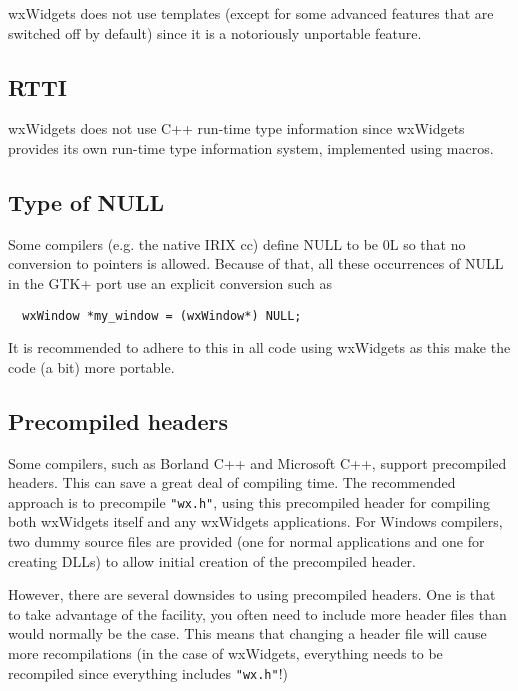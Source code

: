 wxWidgets does not use templates (except for some advanced features that
are switched off by default) since it is a notoriously unportable feature.

\subsection{RTTI}\label{rtti}

wxWidgets does not use C++ run-time type information since wxWidgets provides
its own run-time type information system, implemented using macros.

\subsection{Type of NULL}\label{null}

Some compilers (e.g. the native IRIX cc) define NULL to be 0L so that
no conversion to pointers is allowed. Because of that, all these
occurrences of NULL in the GTK+ port use an explicit conversion such 
as

{\small
\begin{verbatim}
  wxWindow *my_window = (wxWindow*) NULL;
\end{verbatim}
}%

It is recommended to adhere to this in all code using wxWidgets as
this make the code (a bit) more portable.

\subsection{Precompiled headers}\label{precompiledheaders}

Some compilers, such as Borland C++ and Microsoft C++, support
precompiled headers. This can save a great deal of compiling time. The
recommended approach is to precompile {\tt "wx.h"}, using this
precompiled header for compiling both wxWidgets itself and any
wxWidgets applications. For Windows compilers, two dummy source files
are provided (one for normal applications and one for creating DLLs)
to allow initial creation of the precompiled header.

However, there are several downsides to using precompiled headers. One
is that to take advantage of the facility, you often need to include
more header files than would normally be the case. This means that
changing a header file will cause more recompilations (in the case of
wxWidgets, everything needs to be recompiled since everything includes {\tt "wx.h"}!)

